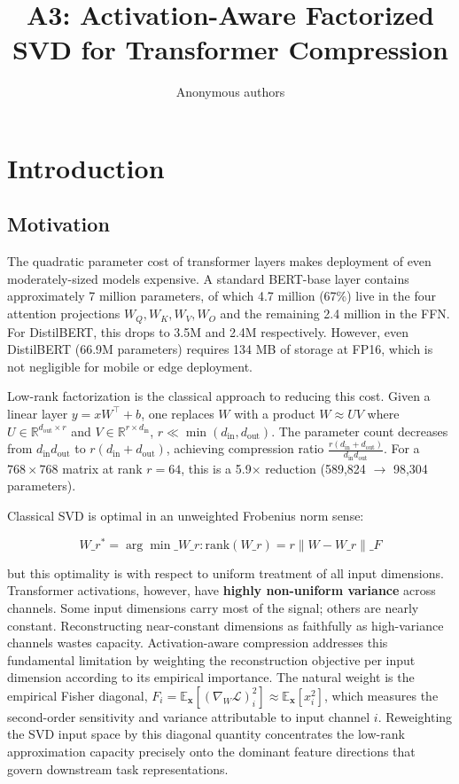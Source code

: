 \title{\textbf{A3: Activation-Aware Factorized SVD for Transformer Compression}}

\author{Anonymous authors}



\section{Introduction}

\subsection{Motivation}

The quadratic parameter cost of transformer layers makes deployment of even 
moderately-sized models expensive. A standard BERT-base layer contains 
approximately 7 million parameters, of which 4.7 million (67\%) live in the 
four attention projections $W_Q, W_K, W_V, W_O$ and the remaining 2.4 million 
in the FFN. For DistilBERT, this drops to 3.5M and 2.4M respectively. However, 
even DistilBERT (66.9M parameters) requires 134 MB of storage at FP16, which 
is not negligible for mobile or edge deployment.

Low-rank factorization is the classical approach to reducing this cost. Given 
a linear layer $y = x W^\top + b$, one replaces $W$ with a product $W \approx U V$ 
where $U \in \mathbb{R}^{d_\text{out} \times r}$ and $V \in \mathbb{R}^{r \times d_\text{in}}$, 
$r \ll \min(d_\text{in}, d_\text{out})$. The parameter count decreases from 
$d_\text{in} d_\text{out}$ to $r(d_\text{in} + d_\text{out})$, achieving 
compression ratio $\frac{r(d_\text{in} + d_\text{out})}{d_\text{in} d_\text{out}}$. 
For a $768 \times 768$ matrix at rank $r = 64$, this is a 5.9$\times$ reduction 
(589,824 $\to$ 98,304 parameters).

Classical SVD is optimal in an unweighted Frobenius norm sense:

\[
W\_r^* = \arg\min\_{W\_r : \text{rank}(W\_r) = r} \|W - W\_r\|\_F
\tag{1.1}
\]

but this optimality is with respect to uniform treatment of all input 
dimensions. Transformer activations, however, have \textbf{highly non-uniform 
variance} across channels. Some input dimensions carry most of the signal; 
others are nearly constant. Reconstructing near-constant dimensions as faithfully as high-variance channels wastes capacity.
Activation-aware compression addresses this fundamental limitation by weighting the reconstruction 
objective per input dimension according to its empirical importance. The natural weight is the empirical Fisher 
diagonal, $F_i = \mathbb{E}_{\mathbf{x}} [(\nabla_{W} \mathcal{L})_{i}^2] \approx \mathbb{E}_{\mathbf{x}}[x_i^2]$, 
which measures the second-order sensitivity and variance attributable to input channel $i$. 
Reweighting the SVD input space by this diagonal quantity concentrates the low-rank approximation 
capacity precisely onto the dominant feature directions that govern downstream task representations.

